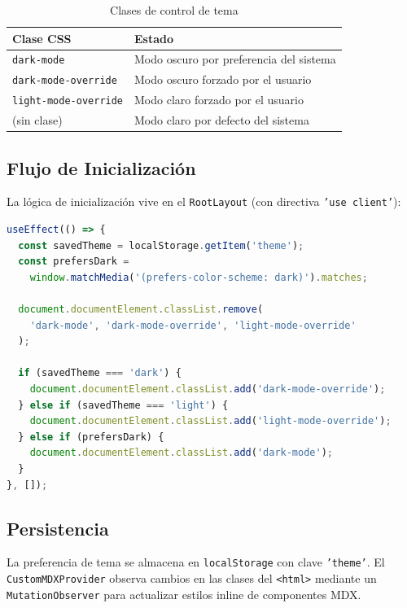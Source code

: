 \documentclass[12pt,a4paper]{article}
\begin{document}
\begin{table}[h]
\centering
\begin{tabular}{ll}
\toprule
\textbf{Clase CSS} & \textbf{Estado} \\
\midrule
\texttt{dark-mode} & Modo oscuro por preferencia del sistema \\
\texttt{dark-mode-override} & Modo oscuro forzado por el usuario \\
\texttt{light-mode-override} & Modo claro forzado por el usuario \\
(sin clase) & Modo claro por defecto del sistema \\
\bottomrule
\end{tabular}
\caption{Clases de control de tema}
\end{table}

\subsection{Flujo de Inicialización}

La lógica de inicialización vive en el \texttt{RootLayout} (con directiva \texttt{'use client'}):

\begin{lstlisting}[language=JavaScript, caption={Inicialización del tema en layout.js}]
useEffect(() => {
  const savedTheme = localStorage.getItem('theme');
  const prefersDark =
    window.matchMedia('(prefers-color-scheme: dark)').matches;

  document.documentElement.classList.remove(
    'dark-mode', 'dark-mode-override', 'light-mode-override'
  );

  if (savedTheme === 'dark') {
    document.documentElement.classList.add('dark-mode-override');
  } else if (savedTheme === 'light') {
    document.documentElement.classList.add('light-mode-override');
  } else if (prefersDark) {
    document.documentElement.classList.add('dark-mode');
  }
}, []);
\end{lstlisting}

\subsection{Persistencia}

La preferencia de tema se almacena en \texttt{localStorage} con clave \texttt{'theme'}. El \texttt{CustomMDXProvider} observa cambios en las clases del \texttt{<html>} mediante un \texttt{MutationObserver} para actualizar estilos inline de componentes MDX.
\end{document}
